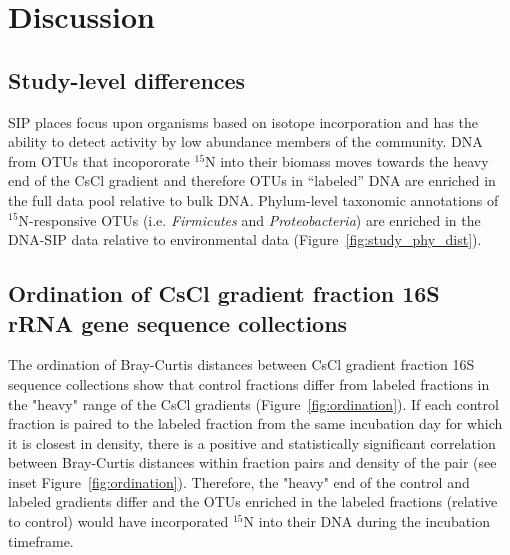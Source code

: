 \section{Discussion}
\subsection{Study-level differences}
SIP places focus upon organisms based on isotope incorporation and has the
ability to detect activity by low abundance members of the community.
DNA from OTUs that incopororate $^{15}$N into their biomass moves towards the
heavy end of the CsCl gradient and therefore OTUs in ``labeled'' DNA are
enriched in the full data pool relative to bulk DNA. Phylum-level taxonomic
annotations of $^{15}$N-responsive OTUs (i.e. \textit{Firmicutes} and
\textit{Proteobacteria}) are enriched in the DNA-SIP data relative to
environmental data (Figure~\ref{fig:study_phy_dist}).

\subsection{Ordination of CsCl gradient fraction 16S rRNA gene sequence collections} 
The ordination of Bray-Curtis distances between CsCl gradient fraction 16S
sequence collections show that control fractions differ from labeled fractions
in the "heavy" range of the CsCl gradients (Figure~\ref{fig:ordination}). If
each control fraction is paired to the labeled fraction from the same
incubation day for which it is closest in density, there is a positive and
statistically significant correlation between Bray-Curtis distances within
fraction pairs and density of the pair (see inset Figure~\ref{fig:ordination}).
Therefore, the "heavy" end of the control and labeled gradients differ and the
OTUs enriched in the labeled fractions (relative to control) would have
incorporated $^{15}$N into their DNA during the incubation timeframe.    


